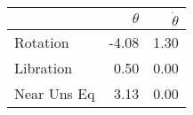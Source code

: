 \begin{tabular}{lrr}
\toprule
{} &  $\theta$ &  $\dot{\theta}$ \\
\midrule
Rotation    &     -4.08 &            1.30 \\
Libration   &      0.50 &            0.00 \\
Near Uns Eq &      3.13 &            0.00 \\
\bottomrule
\end{tabular}

